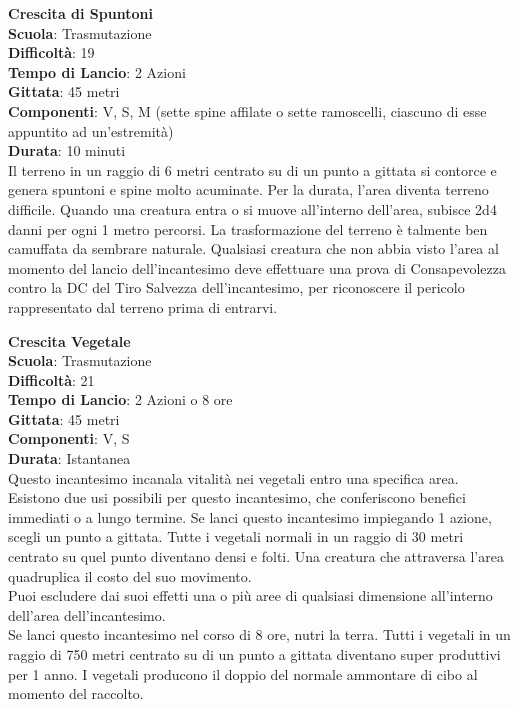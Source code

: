 \begin{multicols}{2}
\medskip\textbf{Crescita di Spuntoni}\\
\textbf{Scuola}: Trasmutazione\\
\textbf{Difficoltà}: 19\\
\textbf{Tempo di Lancio}: 2 Azioni\\
\textbf{Gittata}: 45 metri\\
\textbf{Componenti}: V, S, M (sette spine affilate o sette ramoscelli, ciascuno di esse appuntito ad un'estremità)\\
\textbf{Durata}: 10 minuti\\
Il terreno in un raggio di 6 metri centrato su di un punto a gittata si contorce e genera spuntoni e spine molto acuminate. Per la durata, l'area diventa terreno difficile. Quando una creatura entra o si muove all'interno dell'area, subisce 2d4 danni per ogni 1 metro percorsi.
La trasformazione del terreno è talmente ben camuffata da sembrare naturale. Qualsiasi creatura che non abbia visto l'area al momento del lancio dell'incantesimo deve effettuare una prova di Consapevolezza contro la DC del Tiro Salvezza dell'incantesimo, per riconoscere il pericolo rappresentato dal terreno prima di entrarvi. 

\medskip\textbf{Crescita Vegetale}\\
\textbf{Scuola}: Trasmutazione\\
\textbf{Difficoltà}: 21\\
\textbf{Tempo di Lancio}: 2 Azioni o 8 ore\\
\textbf{Gittata}: 45 metri\\
\textbf{Componenti}: V, S\\
\textbf{Durata}: Istantanea\\
Questo incantesimo incanala vitalità nei vegetali entro una specifica area. Esistono due usi possibili per questo incantesimo, che conferiscono benefici immediati o a lungo termine. Se lanci questo incantesimo impiegando 1 azione, scegli un punto a gittata. Tutte i vegetali normali in un raggio di 30 metri centrato su quel punto diventano densi e folti. Una creatura che attraversa l'area quadruplica il costo del suo movimento.\\
Puoi escludere dai suoi effetti una o più aree di qualsiasi dimensione all'interno dell'area dell'incantesimo.\\
Se lanci questo incantesimo nel corso di 8 ore, nutri la terra. Tutti i vegetali in un raggio di 750 metri centrato su di un punto a gittata diventano super produttivi per 1 anno. I vegetali producono il doppio del normale ammontare di cibo al momento del raccolto.


\end{multicols}
